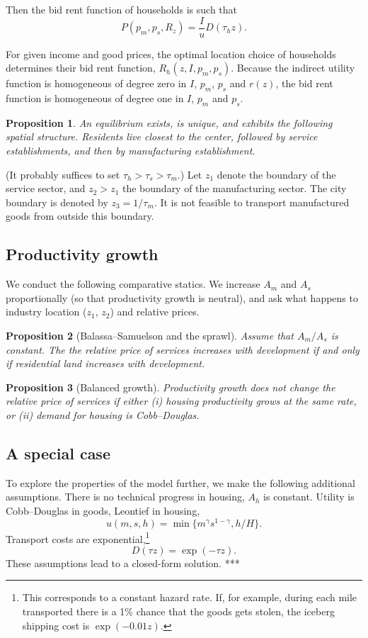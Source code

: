 \documentclass[12pt]{article}
\newtheorem{proposition}{Proposition}
\begin{document}
Then the bid rent function of households is such that
\[
P(p_m,p_s,R_z) = \frac Iu  D(\tau_h z).
\]

For given income and good prices, the optimal location choice of households determines their bid rent function, $R_h(z,I,p_m,p_s)$. Because the indirect utility function is homogeneous of degree zero in $I$, $p_m$, $p_s$ and $r(z)$, the bid rent function is homogeneous of degree one in $I$, $p_m$ and $p_s$.

\begin{proposition}
An equilibrium exists, is unique, and exhibits the following spatial structure. Residents live closest to the center, followed by service establishments, and then by manufacturing establishment.
\end{proposition}

(It probably suffices to set $\tau_h>\tau_s>\tau_m$.) Let $z_1$ denote the boundary of the service sector, and $z_2>z_1$ the boundary of the manufacturing sector. The city boundary is denoted by $z_3 = 1/\tau_m$. It is not feasible to transport manufactured goods from outside this boundary.

\subsection{Productivity growth}
We conduct the following comparative statics. We increase $A_m$ and $A_s$ proportionally (so that productivity growth is neutral), and ask what happens to industry location ($z_1$, $z_2$) and relative prices.
\begin{proposition}[Balassa--Samuelson and the sprawl]
 Assume that $A_m/A_s$ is constant. The the relative price of services increases with development if and only if residential land increases with development.
\end{proposition}

\begin{proposition}[Balanced growth]
Productivity growth does not change the relative price of services if either
      (i) housing productivity grows at the same rate,
      or (ii) demand for housing is Cobb--Douglas.
\end{proposition}

\subsection{A special case}
To explore the properties of the model further, we make the following additional assumptions.
There is no technical progress in housing, $A_h$ is constant. Utility is Cobb--Douglas in goods, Leontief in housing,
\[
u(m,s,h) = \min\{m^\gamma s^{1-\gamma} ,h/H\}.
\]
Transport costs are exponential,\footnote{This corresponds to a constant hazard rate. If, for example, during each mile transported there is a 1\% chance that the goods gets stolen, the iceberg shipping cost is $\exp(-0.01 z)$.}
\[
D(\tau z) = \exp(-\tau z).
\]
These assumptions lead to a closed-form solution. ***
\end{document}
